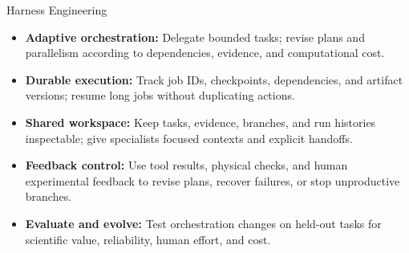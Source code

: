 \begin{frame}[t,label=md-48]{Harness Engineering}
\small
\begin{itemize}
\setlength{\itemsep}{0.65em}
    \item \textbf{Adaptive orchestration:} Delegate bounded tasks; revise plans
    and parallelism according to dependencies, evidence, and computational cost.
    \item \textbf{Durable execution:} Track job IDs, checkpoints, dependencies,
    and artifact versions; resume long jobs without duplicating actions.
    \item \textbf{Shared workspace:} Keep tasks, evidence, branches, and run
    histories inspectable; give specialists focused contexts and explicit handoffs.
    \item \textbf{Feedback control:} Use tool results, physical checks, and human
    experimental feedback to revise plans, recover failures, or stop unproductive branches.
    \item \textbf{Evaluate and evolve:} Test orchestration changes on held-out
    tasks for scientific value, reliability, human effort, and cost.
\end{itemize}
\end{frame}

